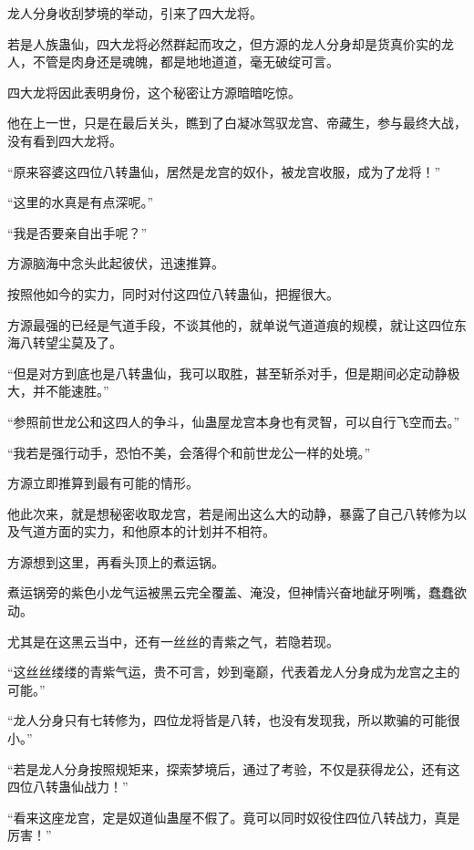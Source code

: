 
\begin{this_body}



龙人分身收刮梦境的举动，引来了四大龙将。

若是人族蛊仙，四大龙将必然群起而攻之，但方源的龙人分身却是货真价实的龙人，不管是肉身还是魂魄，都是地地道道，毫无破绽可言。

四大龙将因此表明身份，这个秘密让方源暗暗吃惊。

他在上一世，只是在最后关头，瞧到了白凝冰驾驭龙宫、帝藏生，参与最终大战，没有看到四大龙将。

“原来容婆这四位八转蛊仙，居然是龙宫的奴仆，被龙宫收服，成为了龙将！”

“这里的水真是有点深呢。”

“我是否要亲自出手呢？”

方源脑海中念头此起彼伏，迅速推算。

按照他如今的实力，同时对付这四位八转蛊仙，把握很大。

方源最强的已经是气道手段，不谈其他的，就单说气道道痕的规模，就让这四位东海八转望尘莫及了。

“但是对方到底也是八转蛊仙，我可以取胜，甚至斩杀对手，但是期间必定动静极大，并不能速胜。”

“参照前世龙公和这四人的争斗，仙蛊屋龙宫本身也有灵智，可以自行飞空而去。”

“我若是强行动手，恐怕不美，会落得个和前世龙公一样的处境。”

方源立即推算到最有可能的情形。

他此次来，就是想秘密收取龙宫，若是闹出这么大的动静，暴露了自己八转修为以及气道方面的实力，和他原本的计划并不相符。

方源想到这里，再看头顶上的煮运锅。

煮运锅旁的紫色小龙气运被黑云完全覆盖、淹没，但神情兴奋地龇牙咧嘴，蠢蠢欲动。

尤其是在这黑云当中，还有一丝丝的青紫之气，若隐若现。

“这丝丝缕缕的青紫气运，贵不可言，妙到毫巅，代表着龙人分身成为龙宫之主的可能。”

“龙人分身只有七转修为，四位龙将皆是八转，也没有发现我，所以欺骗的可能很小。”

“若是龙人分身按照规矩来，探索梦境后，通过了考验，不仅是获得龙公，还有这四位八转蛊仙战力！”

“看来这座龙宫，定是奴道仙蛊屋不假了。竟可以同时奴役住四位八转战力，真是厉害！”


\end{this_body}
